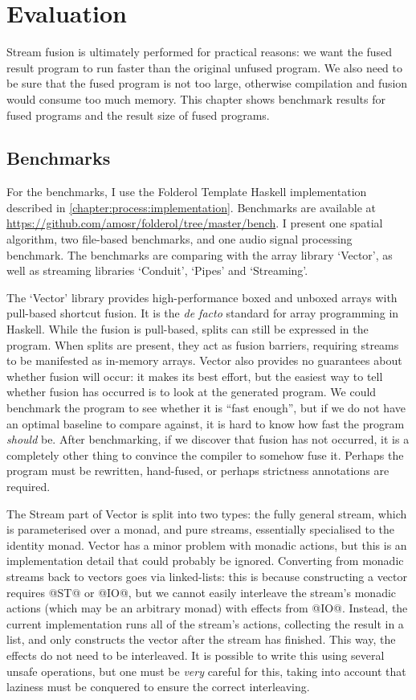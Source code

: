 \chapter{Evaluation}
\label{s:Benchmarks}
Stream fusion is ultimately performed for practical reasons: we want the fused result program to run faster than the original unfused program.
We also need to be sure that the fused program is not too large, otherwise compilation and fusion would consume too much memory.
This chapter shows benchmark results for fused programs and the result size of fused programs.

\section{Benchmarks}

For the benchmarks, I use the Folderol Template Haskell implementation described in \autoref{chapter:process:implementation}.
Benchmarks are available at \url{https://github.com/amosr/folderol/tree/master/bench}.
I present one spatial algorithm, two file-based benchmarks, and one audio signal processing benchmark.
The benchmarks are comparing with the array library `Vector', as well as streaming libraries `Conduit', `Pipes' and `Streaming'.

The `Vector' library provides high-performance boxed and unboxed arrays with pull-based shortcut fusion.
It is the \emph{de facto} standard for array programming in Haskell.
While the fusion is pull-based, splits can still be expressed in the program.
When splits are present, they act as fusion barriers, requiring streams to be manifested as in-memory arrays.
Vector also provides no guarantees about whether fusion will occur: it makes its best effort, but the easiest way to tell whether fusion has occurred is to look at the generated program.
We could benchmark the program to see whether it is ``fast enough'', but if we do not have an optimal baseline to compare against, it is hard to know how fast the program \emph{should} be.
After benchmarking, if we discover that fusion has not occurred, it is a completely other thing to convince the compiler to somehow fuse it.
Perhaps the program must be rewritten, hand-fused, or perhaps strictness annotations are required.

The Stream part of Vector is split into two types: the fully general stream, which is parameterised over a monad, and pure streams, essentially specialised to the identity monad.
Vector has a minor problem with monadic actions, but this is an implementation detail that could probably be ignored.
Converting from monadic streams back to vectors goes via linked-lists: this is because constructing a vector requires @ST@ or @IO@, but we cannot easily interleave the stream's monadic actions (which may be an arbitrary monad) with effects from @IO@.
Instead, the current implementation runs all of the stream's actions, collecting the result in a list, and only constructs the vector after the stream has finished.
This way, the effects do not need to be interleaved.
It is possible to write this using several unsafe operations, but one must be \emph{very} careful for this, taking into account that laziness must be conquered to ensure the correct interleaving.


